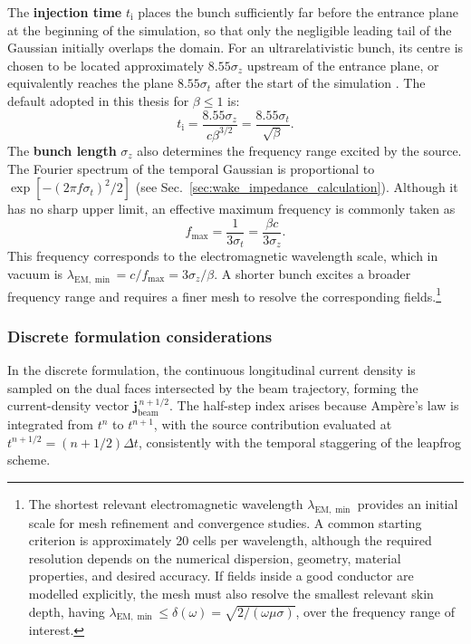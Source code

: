 The \textbf{injection time} $t_{\mathrm{i}}$ places the bunch sufficiently far before the entrance plane at the beginning of the simulation, so that only the negligible leading tail of the Gaussian initially overlaps the domain. For an ultrarelativistic bunch, its centre is chosen to be located approximately $8.55\sigma_z$ upstream of the entrance plane, or equivalently reaches the plane $8.55\sigma_t$ after the start of the simulation
\cite{de_la_fuente_generalized_2023}. The default adopted in this thesis for $\beta\leq1$ is:
%
\begin{equation}
t_{\mathrm{i}} =
\frac{8.55\sigma_z}{c\beta^{3/2}}
=
\frac{8.55\sigma_t}{\sqrt{\beta}}.
\label{eq:beam_injection_time}
\end{equation}
%
The \textbf{bunch length} $\sigma_z$ also determines the frequency range excited by the source. The Fourier spectrum of the temporal Gaussian is proportional to $\exp[-(2\pi f\sigma_t)^2/2]$ (see Sec.~\ref{sec:wake_impedance_calculation}). Although it has no sharp upper limit, an effective maximum frequency is commonly taken as
%
\begin{equation}
f_{\max} =
\frac{1}{3\sigma_t}
=
\frac{\beta c}{3\sigma_z}.
\label{eq:maximum_bunch_frequency}
\end{equation}
%
This frequency corresponds to the electromagnetic wavelength scale, which in vacuum is $\lambda_{\mathrm{EM},\min}= c/f_{\max}=3\sigma_z/\beta$. A shorter bunch excites a broader frequency range and requires a finer mesh to resolve the corresponding fields.\footnote{The shortest relevant electromagnetic wavelength $\lambda_{\mathrm{EM},\min}$ provides an initial scale for mesh refinement and convergence studies. A common starting criterion is approximately 20 cells per wavelength, although the required resolution depends on the numerical dispersion, geometry, material properties, and desired accuracy. If fields inside a good conductor are modelled explicitly, the mesh must also resolve the smallest relevant skin depth, having $\lambda_{\mathrm{EM},\min} \leq \delta(\omega)=\sqrt{2/(\omega\mu\sigma)}$, over the frequency range of interest.}

\subsubsection{Discrete formulation considerations}

In the discrete formulation, the continuous longitudinal current density is sampled on the dual faces intersected by the beam trajectory, forming the current-density vector $\mathbf{j}_{\mathrm{beam}}^{\,n+1/2}$. The half-step index arises because Ampère's law is integrated from $t^n$ to $t^{n+1}$, with the source contribution evaluated at $t^{n+1/2}=(n+1/2)\Delta t$, consistently with the temporal staggering of the leapfrog scheme.

